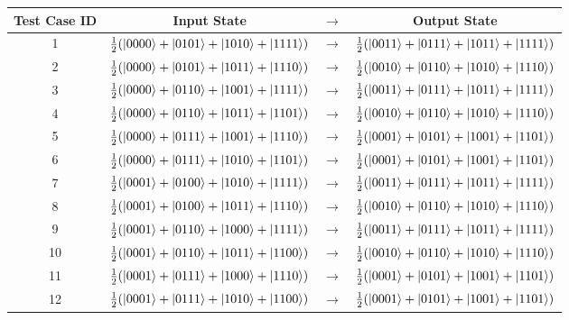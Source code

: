 \begin{figure}
\begin{center}
 \begin{tabular}{c|ccc|} 
 Test Case ID & Input State& $\rightarrow$ & Output State \\  \hline
  1 & $\frac{1}{2}(\ket{0000}+\ket{0101}+\ket{1010}+\ket{1111})$ & $\rightarrow$ & $\frac{1}{2}(\ket{0011}+\ket{0111}+\ket{1011}+\ket{1111})$ \\ %
  2 & $\frac{1}{2}(\ket{0000}+\ket{0101}+\ket{1011}+\ket{1110})$ & $\rightarrow$ & $\frac{1}{2}(\ket{0010}+\ket{0110}+\ket{1010}+\ket{1110})$ \\ %
  3 & $\frac{1}{2}(\ket{0000}+\ket{0110}+\ket{1001}+\ket{1111})$ & $\rightarrow$ & $\frac{1}{2}(\ket{0011}+\ket{0111}+\ket{1011}+\ket{1111})$ \\ %
  4 & $\frac{1}{2}(\ket{0000}+\ket{0110}+\ket{1011}+\ket{1101})$ & $\rightarrow$ & $\frac{1}{2}(\ket{0010}+\ket{0110}+\ket{1010}+\ket{1110})$ \\ %
  5 & $\frac{1}{2}(\ket{0000}+\ket{0111}+\ket{1001}+\ket{1110})$ & $\rightarrow$ & $\frac{1}{2}(\ket{0001}+\ket{0101}+\ket{1001}+\ket{1101})$ \\ %
  6 & $\frac{1}{2}(\ket{0000}+\ket{0111}+\ket{1010}+\ket{1101})$ & $\rightarrow$ & $\frac{1}{2}(\ket{0001}+\ket{0101}+\ket{1001}+\ket{1101})$ \\ \hline
  7 & $\frac{1}{2}(\ket{0001}+\ket{0100}+\ket{1010}+\ket{1111})$ & $\rightarrow$ & $\frac{1}{2}(\ket{0011}+\ket{0111}+\ket{1011}+\ket{1111})$ \\ %
  8 & $\frac{1}{2}(\ket{0001}+\ket{0100}+\ket{1011}+\ket{1110})$ & $\rightarrow$ & $\frac{1}{2}(\ket{0010}+\ket{0110}+\ket{1010}+\ket{1110})$ \\ %
  9 & $\frac{1}{2}(\ket{0001}+\ket{0110}+\ket{1000}+\ket{1111})$ & $\rightarrow$ & $\frac{1}{2}(\ket{0011}+\ket{0111}+\ket{1011}+\ket{1111})$ \\ %
  10 & $\frac{1}{2}(\ket{0001}+\ket{0110}+\ket{1011}+\ket{1100})$ & $\rightarrow$ & $\frac{1}{2}(\ket{0010}+\ket{0110}+\ket{1010}+\ket{1110})$ \\ %
  11 & $\frac{1}{2}(\ket{0001}+\ket{0111}+\ket{1000}+\ket{1110})$ & $\rightarrow$ & $\frac{1}{2}(\ket{0001}+\ket{0101}+\ket{1001}+\ket{1101})$ \\ %
  12 & $\frac{1}{2}(\ket{0001}+\ket{0111}+\ket{1010}+\ket{1100})$ & $\rightarrow$ & $\frac{1}{2}(\ket{0001}+\ket{0101}+\ket{1001}+\ket{1101})$ \\ \hline

\end{tabular}
\end{center}
\end{figure}
